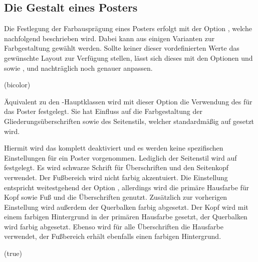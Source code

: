\begin{DeclareEntity}{}
\subsection{Die Gestalt eines Posters}

Die Festlegung der Farbausprägung eines Posters erfolgt mit der Option 
, welche nachfolgend beschrieben wird. Dabei kann aus einigen 
Varianten zur Farbgestaltung gewählt werden. Sollte keiner dieser 
vordefinierten Werte das gewünschte Layout zur Verfügung stellen, lässt sich 
dieses mit den Optionen  und  sowie 
,  und  nachträglich 
noch genauer anpassen.


\begin{Declaration}
  {}
  (bicolor)

Äquivalent zu den \TUDScript-Hauptklassen wird mit dieser Option die Verwendung 
des \TUDCDs für das Poster festgelegt. Sie hat Einfluss auf die Farbgestaltung 
der Gliederungsüberschriften sowie des Seitenstils, welcher standardmäßig auf 
 gesetzt wird.
\begin{DeclareValues}
  Hiermit wird das \CD komplett deaktiviert und es werden keine spezifischen 
  Einstellungen für ein Poster vorgenommen. Lediglich der Seitenstil wird auf 
   festgelegt.
  Es wird schwarze Schrift für Überschriften und den Seitenkopf verwendet. Der 
  Fußbereich wird nicht farbig akzentuiert.
  Die Einstellung entspricht weitestgehend der Option , 
  allerdings wird die primäre Hausfarbe  für Kopf sowie Fuß und 
  die Überschriften genutzt.
  Zusätzlich zur vorherigen Einstellung wird außerdem der Querbalken farbig 
  abgesetzt.
  Der Kopf wird mit einem farbigen Hintergrund in der primären Hausfarbe 
   gesetzt, der Querbalken wird farbig abgesetzt. Ebenso wird für 
  alle Überschriften die Hausfarbe verwendet, der Fußbereich erhält ebenfalls 
  einen farbigen Hintergrund.
\end{DeclareValues}
\end{Declaration}

\begin{Declaration}
  {}
  (true)


\end{Declaration}
\end{DeclareEntity}
